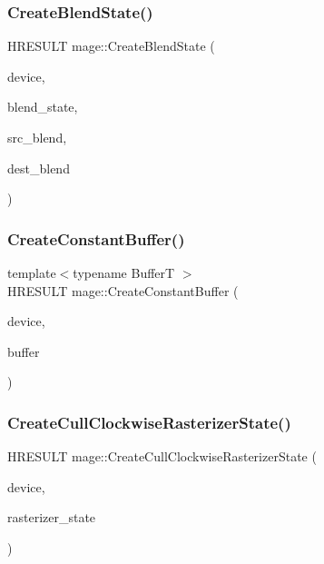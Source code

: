 \hypertarget{namespacemage_ad2c838028ab44521fe1818721dd7ade1}{}\label{namespacemage_ad2c838028ab44521fe1818721dd7ade1} 
\subsubsection{\texorpdfstring{Create\+Blend\+State()}{CreateBlendState()}}
{\footnotesize\ttfamily H\+R\+E\+S\+U\+LT mage\+::\+Create\+Blend\+State (\begin{DoxyParamCaption}\item[{I\+D3\+D11\+Device2 $\ast$}]{device,  }\item[{I\+D3\+D11\+Blend\+State $\ast$$\ast$}]{blend\+\_\+state,  }\item[{D3\+D11\+\_\+\+B\+L\+E\+ND}]{src\+\_\+blend,  }\item[{D3\+D11\+\_\+\+B\+L\+E\+ND}]{dest\+\_\+blend }\end{DoxyParamCaption})}

\hypertarget{namespacemage_ac008dfd1f142382a04c5e3fd3a3e062e}{}\label{namespacemage_ac008dfd1f142382a04c5e3fd3a3e062e} 
\subsubsection{\texorpdfstring{Create\+Constant\+Buffer()}{CreateConstantBuffer()}}
{\footnotesize\ttfamily template$<$typename BufferT $>$ \\
H\+R\+E\+S\+U\+LT mage\+::\+Create\+Constant\+Buffer (\begin{DoxyParamCaption}\item[{I\+D3\+D11\+Device2 $\ast$}]{device,  }\item[{I\+D3\+D11\+Buffer $\ast$$\ast$}]{buffer }\end{DoxyParamCaption})}

\hypertarget{namespacemage_a033a0ae29692c9fc223e532b7487aed5}{}\label{namespacemage_a033a0ae29692c9fc223e532b7487aed5} 
\subsubsection{\texorpdfstring{Create\+Cull\+Clockwise\+Rasterizer\+State()}{CreateCullClockwiseRasterizerState()}}
{\footnotesize\ttfamily H\+R\+E\+S\+U\+LT mage\+::\+Create\+Cull\+Clockwise\+Rasterizer\+State (\begin{DoxyParamCaption}\item[{I\+D3\+D11\+Device2 $\ast$}]{device,  }\item[{I\+D3\+D11\+Rasterizer\+State $\ast$$\ast$}]{rasterizer\+\_\+state }\end{DoxyParamCaption})}

